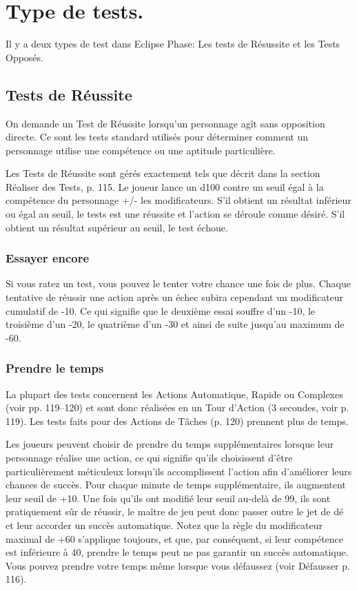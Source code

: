 \section{Type de tests.} \label{sec:types-tests} 

Il y a deux types de test dans Eclipse Phase: Les tests de Résussite  et les Tests Opposés. 

\subsection{Tests de Réussite} \label{sec:success-tests} 

On demande un Test de Réussite lorsqu'un personnage agît sans opposition directe. Ce sont les tests standard utilisés pour déterminer comment un personnage utilise une compétence ou une aptitude particulière. 

Les Tests de Réussite sont gérés exactement tels que décrit dans la section Réaliser des Tests, p. 115. Le joueur lance un d100 contre un seuil égal à la compétence du personnage +/- les modificateurs. S'il obtient un résultat inférieur ou égal au seuil, le tests est une réussite et l'action se déroule comme désiré. S'il obtient un résultat supérieur au seuil, le test échoue. 

\subsubsection{Essayer encore} \label{sec:trying-again} 

Si vous ratez un test, vous pouvez le tenter votre chance une fois de plus. Chaque tentative de réussir une action après un échec subira cependant un modificateur cumulatif de -10. Ce qui signifie que le deuxième essai souffre d'un -10, le troisième d'un -20, le quatrième d'un -30 et ainsi de suite jusqu'au maximum de -60. 

\subsubsection{Prendre le temps} \label{sec:taking-time} 

La plupart des tests concernent les Actions Automatique, Rapide ou Complexes (voir pp. 119–120) et sont donc réalisées en un Tour d'Action (3 secondes, voir p. 119). Les tests faits pour des Actions de Tâches (p. 120) prennent plus de temps. 

Les joueurs peuvent choisir de prendre du temps supplémentaires lorsque leur personnage réalise une action, ce qui signifie qu'ils choisissent d'être particulièrement méticuleux lorsqu'ils accomplissent l'action afin d'améliorer leurs chances de succès. Pour chaque minute de temps supplémentaire, ils augmentent leur seuil de +10. Une fois qu'ils ont modifié leur seuil au-delà de 99, ils sont pratiquement sûr de réussir, le maître de jeu peut donc passer outre le jet de dé et leur accorder un succès automatique. Notez que la règle du modificateur maximal de +60 s'applique toujours, et que, par conséquent, si leur compétence est inférieure à 40, prendre le temps peut ne pas garantir un succès automatique. Vous pouvez prendre votre temps même lorsque vous défaussez (voir Défausser p. 116). 

